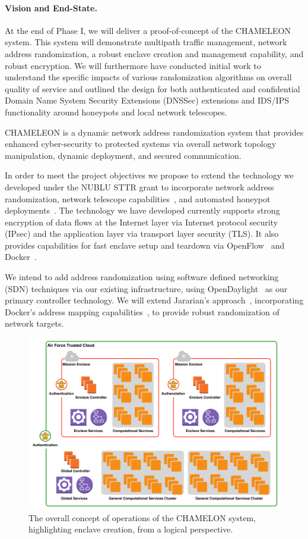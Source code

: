 \documentclass{sbir}
\begin{document}
\paragraph{Vision and End-State.} At the end of Phase I, we will deliver a proof-of-concept of the CHAMELEON system. This system will demonstrate multipath traffic management, network address randomization, a robust enclave creation and management capability, and robust encryption. We will furthermore have conducted initial work to understand the specific impacts of various randomization algorithms on overall quality of service and outlined the design for both authenticated and confidential Domain Name System Security Extensions (DNSSec) extensions and IDS/IPS functionality around honeypots and local network telescopes.

{CHAMELEON is a dynamic network address randomization system that provides enhanced cyber-security to protected systems via overall network topology manipulation, dynamic deployment, and secured communication.}

In order to meet the project objectives we propose to extend the technology we developed under the NUBLU STTR grant to incorporate network address randomization, network telescope capabilities~\cite{MoShVo:04}, and automated honeypot deployments~\cite{honeypot}. The technology we have developed currently supports strong encryption of data flows at the Internet layer via Internet protocol security (IPsec) and the application layer via transport layer security  (TLS). It also provides capabilities for fast enclave setup and teardown via OpenFlow~\cite{openflow1.4} and Docker~\cite{docker}.

We intend to add address randomization using software defined networking (SDN) techniques via our existing infrastructure, using OpenDaylight~\cite{opendaylight} as our primary controller technology. We will extend Jararian's approach~\cite{JaAlDu:12}, incorporating Docker's address mapping capabilities~\cite{docker}, to provide robust randomization of network targets.

\begin{figure}[!t]
\centering
\includegraphics[width=\textwidth]{images/conops.pdf}
\caption{The overall concept of operations of the CHAMELON system, highlighting enclave creation, from a logical perspective.}
\label{fig:conops}
\end{figure}
\end{document}
